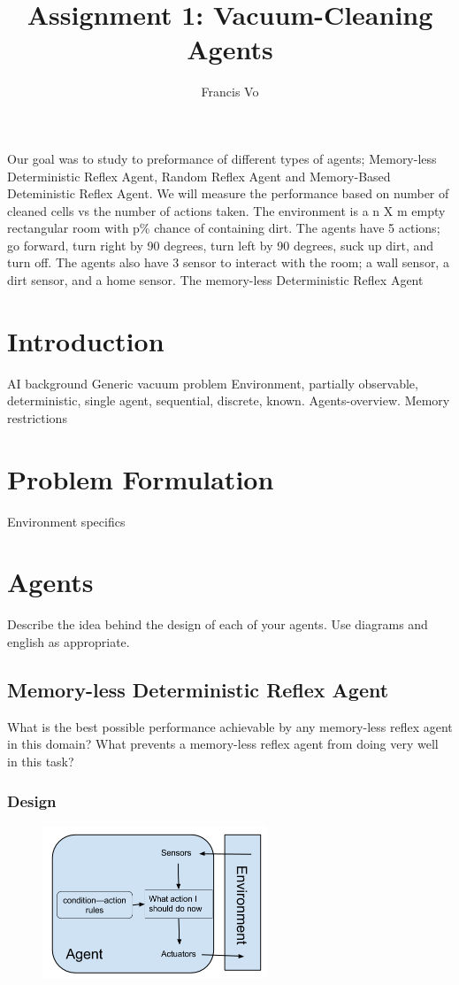 \documentclass[a4paper,10pt]{article}
\title{Assignment 1: Vacuum-Cleaning Agents}
\author{Francis Vo}
\begin{document}
\maketitle
Our goal was to study to preformance of different types of agents; Memory-less Deterministic Reflex Agent, Random Reflex Agent and Memory-Based Deteministic Reflex Agent.
We will measure the performance based on number of cleaned cells vs the number of actions taken.
The environment is a n X m empty rectangular room with p\% chance of containing dirt.
The agents have 5 actions; go forward, turn right by 90 degrees, turn left by 90 degrees, suck up dirt, and turn off.
The agents also have 3 sensor to interact with the room; a wall sensor, a dirt sensor, and a home sensor.
The memory-less Deterministic Reflex Agent

\section{Introduction}
AI background
Generic vacuum problem
Environment, partially observable, deterministic, single agent, sequential, discrete, known.
Agents-overview. Memory restrictions




\section{Problem Formulation}
Environment specifics

\section{Agents}
Describe the idea behind the design of each of your agents. Use diagrams and english as appropriate.
\subsection{Memory-less Deterministic Reflex Agent}
What is the best possible performance achievable by any memory-less reflex agent in this domain? What prevents a memory-less reflex agent from doing very well in this task?
\subsubsection{Design}
\begin{figure}[H]
	\begin{center}
		\includegraphics[width=0.6\textwidth]{MemorylessReflex.png}
	\end{center}
\end{figure}
\end{document}
